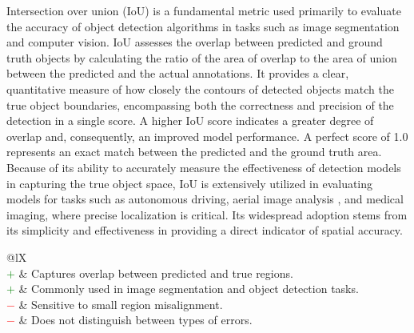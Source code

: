 \documentclass{article}
\begin{document}
Intersection over union (IoU) \cite{jaccard1912distribution, murphy1996finley, rezatofighi2019generalized, zou2023object} is a fundamental metric used primarily to evaluate the accuracy of object detection algorithms in tasks such as image segmentation and computer vision. IoU assesses the overlap between predicted and ground truth objects by calculating the ratio of the area of overlap to the area of union between the predicted and the actual annotations. It provides a clear, quantitative measure of how closely the contours of detected objects match the true object boundaries, encompassing both the correctness and precision of the detection in a single score. A higher IoU score indicates a greater degree of overlap and, consequently, an improved model performance. A perfect score of 1.0 represents an exact match between the predicted and the ground truth area. Because of its ability to accurately measure the effectiveness of detection models in capturing the true object space, IoU is extensively utilized in evaluating models for tasks such as autonomous driving, aerial image analysis \cite{al2018survey, akbari2021applications}, and medical imaging, where precise localization is critical. Its widespread adoption stems from its simplicity and effectiveness in providing a direct indicator of spatial accuracy.

\begin{table}[H]\centering
	\begin{tabularx}{\textwidth}{@{}lX}
		 \\
		\textcolor{Green}{$+$} & Captures overlap between predicted and true regions. \\
		\textcolor{Green}{$+$} & Commonly used in image segmentation and object detection tasks. \\
		\textcolor{Red}{$-$}   & Sensitive to small region misalignment. \\
		\textcolor{Red}{$-$}   & Does not distinguish between types of errors.
	\end{tabularx}
\end{table}
\end{document}
